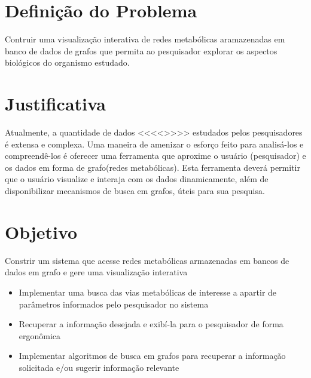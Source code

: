 


\section{Definição do Problema}

\indent 
Contruir uma visualização interativa de redes metabólicas aramazenadas em banco de dados de grafos que permita ao pesquisador explorar os aspectos biológicos do organismo estudado.



\section{Justificativa}

\indent 

Atualmente, a quantidade de dados <<<<>>>> estudados pelos pesquisadores é extensa e complexa. Uma maneira de amenizar o esforço feito para analisá-los e compreendê-los é oferecer uma ferramenta que aproxime o usuário (pesquisador) e os dados em forma de grafo(redes metabólicas). Esta ferramenta deverá permitir que o usuário visualize e interaja com os dados dinamicamente, além de disponibilizar mecanismos de busca em grafos, úteis para sua pesquisa.


\section{Objetivo}

\indent 
Constrir um sistema que acesse redes metabólicas armazenadas em bancos de dados em grafo e gere uma visualização interativa
\begin{itemize}
 \item Implementar uma busca das vias metabólicas de interesse a apartir de parâmetros informados pelo pesquisador no sistema
 \item Recuperar a informação desejada e exibí-la para o pesquisador de forma ergonômica
 \item Implementar algoritmos de busca em grafos para recuperar a informação solicitada e/ou sugerir informação relevante
\end{itemize}

